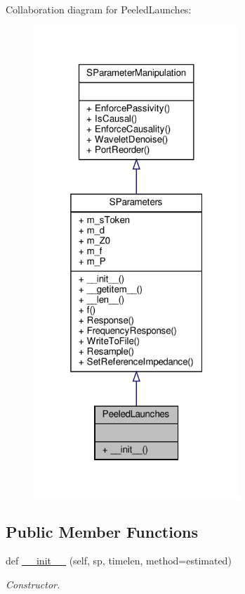 Collaboration diagram for Peeled\+Launches\+:\nopagebreak
\begin{figure}[H]
\begin{center}
\leavevmode
\includegraphics[width=220pt]{classSignalIntegrity_1_1ImpedanceProfile_1_1PeeledLaunches_1_1PeeledLaunches__coll__graph}
\end{center}
\end{figure}
\subsection*{Public Member Functions}
\begin{DoxyCompactItemize}
\item 
def \hyperlink{classSignalIntegrity_1_1ImpedanceProfile_1_1PeeledLaunches_1_1PeeledLaunches_a5ad5af04a370e25cc809b024b20dd7ba}{\+\_\+\+\_\+init\+\_\+\+\_\+} (self, sp, timelen, method=\textquotesingle{}estimated\textquotesingle{})
\begin{DoxyCompactList}\small\item\em Constructor. \end{DoxyCompactList}\end{DoxyCompactItemize}



